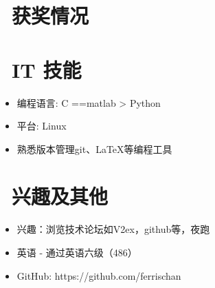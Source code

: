 \documentclass{resume}
\begin{document}
\section{\faHeartO\ 获奖情况}
  
\section{\faCogs\ IT 技能}
\begin{itemize}[parsep=0.5ex]
  \item 编程语言: C ==matlab > Python 
  \item 平台: Linux
  \item 熟悉版本管理git、LaTeX等编程工具
\end{itemize}

\section{\faInfo\ 兴趣及其他}
\begin{itemize}[parsep=0.5ex]
  \item 兴趣：浏览技术论坛如V2ex，github等，夜跑  
  \item 英语 - 通过英语六级（486）
  \item GitHub: https://github.com/ferrischan

\end{itemize}

%
%
\end{document}
